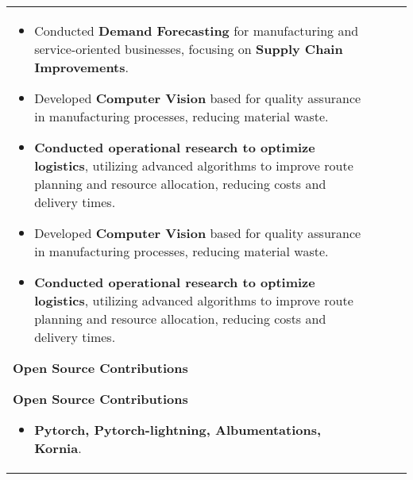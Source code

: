 \documentclass[10pt,a4]{article}
\begin{document}
{\begin{tabu}
\begin{center}
\begin{tabular} {p{} p{} p{} p{}}
\begin{flushleft}
\begin{itemize}
        \item Conducted \textbf{Demand Forecasting} for manufacturing and service-oriented businesses, focusing on \textbf{Supply Chain Improvements}.
        \item Developed \textbf{Computer Vision} based for quality assurance in manufacturing processes, reducing material waste.  
        \item \textbf{Conducted operational research to optimize logistics}, utilizing advanced algorithms to improve route planning and resource allocation, reducing costs and delivery times.
        \item Developed \textbf{Computer Vision} based for quality assurance in manufacturing processes, reducing material waste.  
        \item \textbf{Conducted operational research to optimize logistics}, utilizing advanced algorithms to improve route planning and resource allocation, reducing costs and delivery times.
    \end{itemize}

    \vspace{1.0mm}
    \hspace{1.5mm} \textbf{\large Open Source Contributions}

    \vspace{1.0mm}
    \hspace{1.5mm} \textbf{\large Open Source Contributions}
    \begin{itemize}
        \item \textbf{Pytorch, Pytorch-lightning, Albumentations, Kornia}.
    \end{itemize}
\end{flushleft}






\end{tabular}
\end{center}
\end{tabu}}
\end{document}
